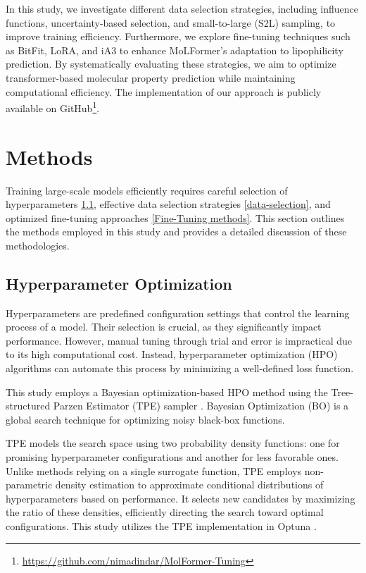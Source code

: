 \documentclass[11pt]{article}
\begin{document}
In this study, we investigate different data selection strategies, including influence functions, uncertainty-based selection, and small-to-large (S2L) sampling, to improve training efficiency. Furthermore, we explore fine-tuning techniques such as BitFit, LoRA, and iA3 to enhance MoLFormer’s adaptation to lipophilicity prediction. By systematically evaluating these strategies, we aim to optimize transformer-based molecular property prediction while maintaining computational efficiency. The implementation of our approach is publicly available on GitHub\footnote{\url{https://github.com/nimadindar/MolFormer-Tuning}}.

\section{Methods}
\label{methods}
Training large-scale models efficiently requires careful selection of hyperparameters \ref{Hyperparameter Optimization}, effective data selection strategies \ref{data-selection}, and optimized fine-tuning approaches \ref{Fine-Tuning methods}. This section outlines the methods employed in this study and provides a detailed discussion of these methodologies.
\subsection{Hyperparameter Optimization}
\label{Hyperparameter Optimization}
Hyperparameters are predefined configuration settings that control the learning process of a model. Their selection is crucial, as they significantly impact performance. However, manual tuning through trial and error is impractical due to its high computational cost. Instead, hyperparameter optimization (HPO) algorithms can automate this process by minimizing a well-defined loss function.

This study employs a Bayesian optimization-based HPO method using the Tree-structured Parzen Estimator (TPE) sampler \cite{bergstra2011hyperparameter}. Bayesian Optimization (BO) is a global search technique for optimizing noisy black-box functions.

TPE models the search space using two probability density functions: one for promising hyperparameter configurations and another for less favorable ones. Unlike methods relying on a single surrogate function, TPE employs non-parametric density estimation to approximate conditional distributions of hyperparameters based on performance. It selects new candidates by maximizing the ratio of these densities, efficiently directing the search toward optimal configurations. This study utilizes the TPE implementation in Optuna \cite{10.1145/3292500.3330701}.
\end{document}
